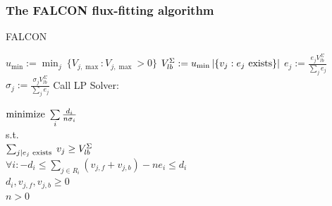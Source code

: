 \documentclass[compress]{beamer}
\begin{document}

\begin{frame}[fragile]
\frametitle{The FALCON flux-fitting algorithm}

\begin{algorithm}[H]
\tiny
\caption{FALCON}
\label{alg:FALCON}
\begin{algorithmic}
\State $u_{\min} := \min_j\ \{V_{j,\max} : V_{j,\max} > 0\}$
\State $V_{lb}^{\Sigma} := u_{\min} \left|\{v_j : e_j \textnormal{ exists}\}\right|$
  \State $e_j := \frac{e_j V_{lb}^{\Sigma}}
    {\sum\limits_{j} e_j}$ 
  \State $\sigma_j := \frac{\sigma_j V_{lb}^{\Sigma}}
    {\sum\limits_{j} e_j}$
\EndFor
{}
  \State Call LP Solver:
  \State \hspace{4.8mm} \parbox[t]{\dimexpr\linewidth-\algorithmicindent}{
    $\textnormal{minimize}\ \sum\limits_i \frac{d_i}{n \sigma_i}$\\
    s.t.\\
    $\sum_{j \mid e_j \textnormal{ exists }} v_j \geq V_{lb}^{\Sigma}$\\ 
    $\forall i: -d_i \leq \sum\nolimits_{j \in R_i} (v_{j,f} +
    v_{j,b}) - n e_i \leq d_i$\\ 
    $d_i, v_{j,f}, v_{j,b} \geq 0$\\ 
    $n > 0$
    \strut}
  \EndFor
\EndWhile
\end{algorithmic}
\end{algorithm}

\end{frame}

\end{document}
